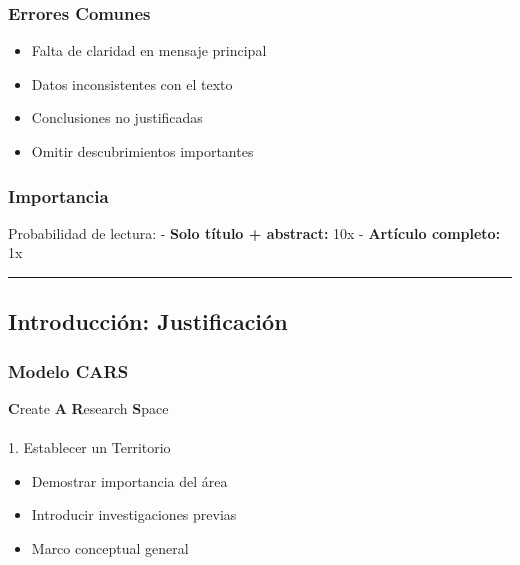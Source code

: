 \documentclass[
  11pt,
]{beaner}
\makeatletter
\let\oldparagraph\paragraph
\renewcommand{\paragraph}{
    \@ifstar
      \xxxParagraphStar
      \xxxParagraphNoStar
  }
\newcommand{\xxxParagraphStar}[1]{\oldparagraph*{#1}\mbox{}}
\newcommand{\xxxParagraphNoStar}[1]{\oldparagraph{#1}\mbox{}}
\providecommand{\tightlist}{%
  \setlength{\itemsep}{0pt}\setlength{\parskip}{0pt}}
\makeatother
\begin{document}
\subsubsection{Errores Comunes}\label{errores-comunes-1}

\begin{itemize}
\tightlist
\item
  Falta de claridad en mensaje principal\\
\item
  Datos inconsistentes con el texto\\
\item
  Conclusiones no justificadas\\
\item
  Omitir descubrimientos importantes
\end{itemize}

\subsubsection{Importancia}\label{importancia}

Probabilidad de lectura: - \textbf{Solo título + abstract:} 10x -
\textbf{Artículo completo:} 1x

\begin{center}\rule{0.5\linewidth}{0.5pt}\end{center}

\subsection{Introducción:
Justificación}\label{introducciuxf3n-justificaciuxf3n}

\subsubsection{Modelo CARS}\label{modelo-cars}

\textbf{C}reate \textbf{A} \textbf{R}esearch \textbf{S}pace

\paragraph{1. Establecer un Territorio}\label{establecer-un-territorio}

\begin{itemize}
\tightlist
\item
  Demostrar importancia del área
\item
  Introducir investigaciones previas
\item
  Marco conceptual general
\end{itemize}
\end{document}

